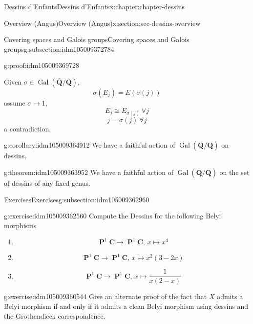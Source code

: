 \documentclass[oneside,10pt,]{book}
\numberwithin{equation}{section}
\newcommand{\QQ}{\mathbf{Q}}
\newcommand{\CC}{\mathbf{C}}
\newcommand{\absgal}[1]{\operatorname{Gal}(\overline{#1}/#1)}
\DeclareMathOperator{\PP}{\mathbf{P}}
\begin{document}
\begin{chapterptx}{Dessins d'Enfants}{}{Dessins d'Enfants}{}{}{x:chapter:chapter-dessins}
\begin{sectionptx}{Overview (Angus)}{}{Overview (Angus)}{}{}{x:section:sec-dessins-overview}
\begin{subsectionptx}{Covering spaces and Galois groups}{}{Covering spaces and Galois groups}{}{}{g:subsection:idm105009372784}
\begin{proofptx}{}{g:proof:idm105009369728}
\par
Given \(\sigma \in \absgal{\QQ}\),%
\begin{equation*}
\sigma(E_j) = E(\sigma(j))
\end{equation*}
assume \(\sigma \mapsto 1\),%
\begin{equation*}
E_j \cong E_{\sigma(j)}\ \forall j
\end{equation*}
%
\begin{equation*}
j = \sigma(j) \ \forall j
\end{equation*}
a contradiction.%
\end{proofptx}
\begin{corollary}{}{}{g:corollary:idm105009364912}%
We have a faithful action of \(\absgal{\QQ}\) on dessins.%
\end{corollary}
\begin{theorem}{}{}{g:theorem:idm105009363952}%
We have a faithful action of \(\absgal{\QQ}\) on the set of dessins of any fixed genus.%
\end{theorem}
\end{subsectionptx}
%
%
\typeout{************************************************}
\typeout{************************************************}
%
\begin{subsectionptx}{Exercises}{}{Exercises}{}{}{g:subsection:idm105009362960}
\begin{inlineexercise}{}{g:exercise:idm105009362560}%
Compute the Dessins for the following Belyi morphisms%
\begin{enumerate}
\item{}%
\begin{equation*}
\PP^1\CC\to \PP^1\CC,\,x\mapsto x^4
\end{equation*}
%
\item{}%
\begin{equation*}
\PP^1\CC\to \PP^1\CC,\,x\mapsto x^2(3-2x)
\end{equation*}
%
\item{}%
\begin{equation*}
\PP^1\CC\to \PP^1\CC,\,x\mapsto \frac{1}{x(2-x)}
\end{equation*}
%
\end{enumerate}
%
\end{inlineexercise}
\begin{inlineexercise}{}{g:exercise:idm105009360544}%
Give an alternate proof of the fact that \(X\) admits a Belyi morphism if and only if it admits a clean Belyi morphism using dessins and the Grothendieck correspondence.%

\end{inlineexercise}
\end{subsectionptx}
\end{sectionptx}
\end{chapterptx}
\end{document}
